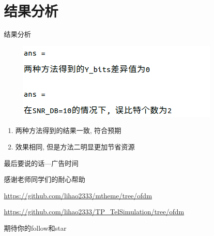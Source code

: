 \documentclass[UTF8]{ctexbeamer}
\begin{document}
  \section{结果分析}
  \begin{frame}{结果分析}
	\begin{figure}
	  \includegraphics[width=\textwidth]{figure/result.png}
	\end{figure}
	\begin{enumerate}
	  \item 两种方法得到的结果一致, 符合预期
	  \item	效果相同, 但是方法二明显更加节省资源
	\end{enumerate}
  \end{frame}
  \begin{frame}{最后要说的话---广告时间}
	\begin{itemsize}
	  \item 感谢老师同学们的耐心帮助
	  \item	\url{https://github.com/lihao2333/mtheme/tree/ofdm}
	  \item	\url{https://github.com/lihao2333/TP_TelSimulation/tree/ofdm}
	  \item 期待你的follow和star
	\end{itemsize}

  \end{frame}
\end{document}
